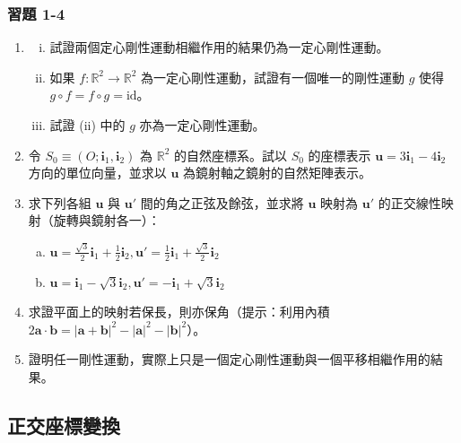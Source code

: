 \subsubsection*{習題 1-4}
\begin{enumerate}
  \item 
  \begin{enumerate}[(i)]
    \item 試證兩個定心剛性運動相繼作用的結果仍為一定心剛性運動。
    \item 如果 $f: \mathbb{R}^2 \to \mathbb{R}^2$ 為一定心剛性運動，試證有一個唯一的剛性運動 $g$ 使得 $g \circ f = f \circ g = \mathrm{id}$。
    \item 試證 (ii) 中的 $g$ 亦為一定心剛性運動。
  \end{enumerate}

  \item 令 $S_0 \equiv (O; \mathbf{i}_1, \mathbf{i}_2)$ 為 $\mathbb{R}^2$ 的自然座標系。試以 $S_0$ 的座標表示 $\mathbf{u} = 3\mathbf{i}_1 - 4\mathbf{i}_2$ 方向的單位向量，並求以 $\mathbf{u}$ 為鏡射軸之鏡射的自然矩陣表示。

  \item 求下列各組 $\mathbf{u}$ 與 $\mathbf{u}'$ 間的角之正弦及餘弦，並求將 $\mathbf{u}$ 映射為 $\mathbf{u}'$ 的正交線性映射（旋轉與鏡射各一）：
  \begin{enumerate}[a.]
    \item $\mathbf{u} = \frac{\sqrt{3}}{2}\mathbf{i}_1 + \frac{1}{2}\mathbf{i}_2, \mathbf{u}' = \frac{1}{2}\mathbf{i}_1 + \frac{\sqrt{3}}{2}\mathbf{i}_2$
    \item $\mathbf{u} = \mathbf{i}_1 - \sqrt{3}\mathbf{i}_2, \mathbf{u}' = -\mathbf{i}_1 + \sqrt{3}\mathbf{i}_2$
  \end{enumerate}

  \item 求證平面上的映射若保長，則亦保角（提示：利用內積 $2\mathbf{a} \cdot \mathbf{b} = |\mathbf{a} + \mathbf{b}|^2 - |\mathbf{a}|^2 - |\mathbf{b}|^2$）。

  \item 證明任一剛性運動，實際上只是一個定心剛性運動與一個平移相繼作用的結果。
\end{enumerate}
\subsection{正交座標變換}
\label{sec:b4-1-5}

